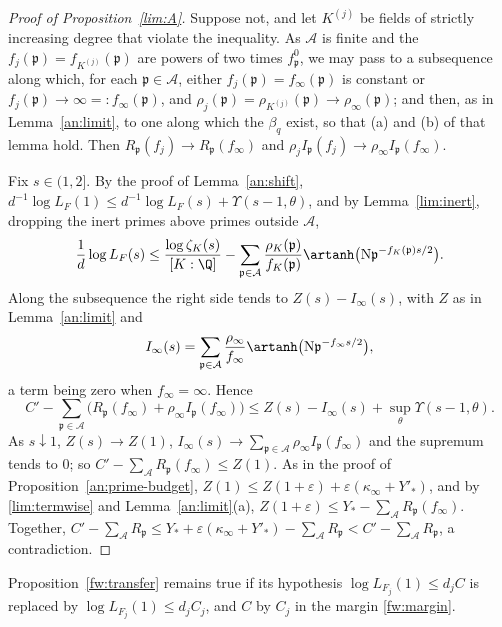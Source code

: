 \begin{proof}[Proof of Proposition~\ref{lim:A}]
Suppose not, and let $K^{(j)}$ be fields of strictly increasing degree that
violate the inequality. As $\mathcal A$ is finite and the
$f_j(\mathfrak p)=f_{K^{(j)}}(\mathfrak p)$ are powers of two times
$f^0_{\mathfrak p}$, we may pass to a subsequence along which, for each
$\mathfrak p\in\mathcal A$, either $f_j(\mathfrak p)=f_\infty(\mathfrak p)$ is
constant or $f_j(\mathfrak p)\to\infty=:f_\infty(\mathfrak p)$, and
$\rho_j(\mathfrak p)=\rho_{K^{(j)}}(\mathfrak p)\to\rho_\infty(\mathfrak p)$;
and then, as in Lemma~\ref{an:limit}, to one along which the $\beta_q$ exist,
so that (a) and (b) of that lemma hold. Then $R_{\mathfrak p}(f_j)\to
R_{\mathfrak p}(f_\infty)$ and $\rho_jI_{\mathfrak p}(f_j)\to\rho_\infty
I_{\mathfrak p}(f_\infty)$.

Fix $s\in(1,2]$. By the proof of Lemma~\ref{an:shift},
$d^{-1}\log L_F(1)\le d^{-1}\log L_F(s)+\Upsilon(s-1,\theta)$, and by
Lemma~\ref{lim:inert}, dropping the inert primes above primes outside
$\mathcal A$,
\[
 \frac1d\log L_F(s)\le\frac{\log\zeta_K(s)}{[K:\Q]}-\sum_{\mathfrak p\in\mathcal A}
 \frac{\rho_K(\mathfrak p)}{f_K(\mathfrak p)}
 \artanh\bigl(\mathrm N\mathfrak p^{-f_K(\mathfrak p)s/2}\bigr).
\]
Along the subsequence the right side tends to $Z(s)-I_\infty(s)$, with $Z$ as
in Lemma~\ref{an:limit} and
\[
 I_\infty(s)=\sum_{\mathfrak p\in\mathcal A}\frac{\rho_\infty}{f_\infty}
 \artanh\bigl(\mathrm N\mathfrak p^{-f_\infty s/2}\bigr),
\]
a term being zero when $f_\infty=\infty$. Hence
\[
 C'-\sum_{\mathfrak p\in\mathcal A}\bigl(R_{\mathfrak p}(f_\infty)+\rho_\infty
 I_{\mathfrak p}(f_\infty)\bigr)\le Z(s)-I_\infty(s)+\sup_\theta\Upsilon(s-1,\theta).
\]
As $s\downarrow1$, $Z(s)\to Z(1)$, $I_\infty(s)\to\sum_{\mathfrak p\in\mathcal A}
\rho_\infty I_{\mathfrak p}(f_\infty)$ and the supremum tends to $0$; so
$C'-\sum_{\mathcal A}R_{\mathfrak p}(f_\infty)\le Z(1)$. As in the proof of
Proposition~\ref{an:prime-budget},
$Z(1)\le Z(1+\varepsilon)+\varepsilon(\kappa_\infty+Y'_*)$, and by
\eqref{lim:termwise} and Lemma~\ref{an:limit}(a),
$Z(1+\varepsilon)\le Y_*-\sum_{\mathcal A}R_{\mathfrak p}(f_\infty)$. Together,
$C'-\sum_{\mathcal A}R_{\mathfrak p}\le Y_*+\varepsilon(\kappa_\infty+Y'_*)
-\sum_{\mathcal A}R_{\mathfrak p}<C'-\sum_{\mathcal A}R_{\mathfrak p}$, a
contradiction.
\end{proof}

\begin{lemma}\label{lim:transfer-C}
Proposition~\ref{fw:transfer} remains true if its hypothesis
$\log L_{F_j}(1)\le d_jC$ is replaced by $\log L_{F_j}(1)\le d_jC_j$, and $C$ by
$C_j$ in the margin \eqref{fw:margin}.
\end{lemma}

